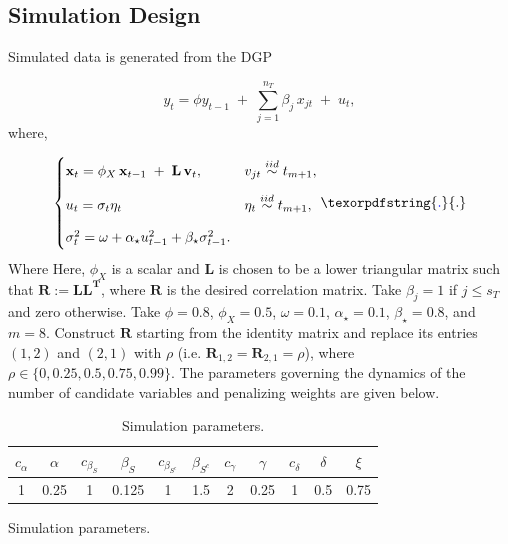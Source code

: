 \documentclass[10pt,a4paper,oneside]{article}
\providecommand{\DIFaddtex}[1]{{\protect\color{blue} \sf #1}} %
\providecommand{\DIFdeltex}[1]{{\protect\color{red} \scriptsize #1}} %
\providecommand{\DIFaddbegin}{} %
\providecommand{\DIFaddend}{} %
\providecommand{\DIFdelbegin}{} %
\providecommand{\DIFdelend}{} %
\providecommand{\DIFaddFL}[1]{\DIFadd{#1}} %
\providecommand{\DIFdelFL}[1]{\DIFdel{#1}} %
\providecommand{\DIFaddbeginFL}{} %
\providecommand{\DIFaddendFL}{} %
\providecommand{\DIFdelbeginFL}{} %
\providecommand{\DIFdelendFL}{} %
\providecommand{\DIFadd}[1]{\texorpdfstring{\DIFaddtex{#1}}{#1}} %
\providecommand{\DIFdel}[1]{\texorpdfstring{\DIFdeltex{#1}}{}} %
\newcommand{\DIFscaledelfig}{0.5}
\newlength{\DIFdelgraphicswidth} %
\newlength{\DIFdelgraphicsheight} %
\newcommand{\DIFaddincludegraphics}[2][]{{\color{blue}\fbox{\DIFOincludegraphics[#1]{#2}}}} %
\newcommand{\DIFdelincludegraphics}[2][]{%
\sbox{\DIFdelgraphicsbox}{\DIFOincludegraphics[#1]{#2}}%
\settoboxwidth{\DIFdelgraphicswidth}{\DIFdelgraphicsbox} %
\settoboxtotalheight{\DIFdelgraphicsheight}{\DIFdelgraphicsbox} %
\scalebox{\DIFscaledelfig}{%
\parbox[b]{\DIFdelgraphicswidth}{\usebox{\DIFdelgraphicsbox}\\[-\baselineskip] \rule{\DIFdelgraphicswidth}{0em}}\llap{\resizebox{\DIFdelgraphicswidth}{\DIFdelgraphicsheight}{%
\setlength{\unitlength}{\DIFdelgraphicswidth}%
\begin{picture}(1,1)%
\thicklines\linethickness{2pt} %
{\color[rgb]{1,0,0}\put(0,0){\framebox(1,1){}}}%
{\color[rgb]{1,0,0}\put(0,0){\line( 1,1){1}}}%
{\color[rgb]{1,0,0}\put(0,1){\line(1,-1){1}}}%
\end{picture}%
}\hspace*{3pt}}} %
} %
\DeclareRobustCommand{\DIFaddbegin}{\DIFOaddbegin \let\includegraphics\DIFaddincludegraphics} %
\DeclareRobustCommand{\DIFaddend}{\DIFOaddend \let\includegraphics\DIFOincludegraphics} %
\DeclareRobustCommand{\DIFdelbegin}{\DIFOdelbegin \let\includegraphics\DIFdelincludegraphics} %
\DeclareRobustCommand{\DIFdelend}{\DIFOaddend \let\includegraphics\DIFOincludegraphics} %
\DeclareRobustCommand{\DIFaddbeginFL}{\DIFOaddbeginFL \let\includegraphics\DIFaddincludegraphics} %
\DeclareRobustCommand{\DIFaddendFL}{\DIFOaddendFL \let\includegraphics\DIFOincludegraphics} %
\DeclareRobustCommand{\DIFdelbeginFL}{\DIFOdelbeginFL \let\includegraphics\DIFdelincludegraphics} %
\DeclareRobustCommand{\DIFdelendFL}{\DIFOaddendFL \let\includegraphics\DIFOincludegraphics} %
\begin{document}
\subsection{Simulation Design}
\label{subsec:simulation_design}


Simulated data is generated from the DGP

\begin{equation*}
y_t 
= 
\displaystyle \phi y_{t - 1}
\;+\;
\sum^{n_T}_{j = 1} \beta_j\,x_{j t}
\;+\; u_t,  
\end{equation*}
where,

\[
\begin{cases}
\mathbf{x}_t=
\displaystyle \phi_X \,\mathbf{x}_{t-1}
\;+\;
\mathbf{L}\,\mathbf{v}_t,
&
v_{jt} \overset{iid}{\sim} t_{m + 1},\\[2ex]
u_t = \sigma_t \eta_t 
&
\eta_t \overset{iid}{\sim} t_{m + 1},\\[2ex]
\sigma^2_t = \omega + \alpha_{\star} u_{t - 1}^2 + \beta_{\star} \sigma^2_{t - 1}.
\end{cases}\DIFaddbegin \DIFadd{.
}\DIFaddend \]
\DIFdelbegin \DIFdel{Where }\DIFdelend \DIFaddbegin \DIFadd{Here, }\DIFaddend $\phi_X$ is a scalar and $\mathbf{L}$ is chosen to be a lower triangular matrix such that $\mathbf{R} := \mathbf{L} \mathbf{L^T}$, where $\mathbf{R}$ is the desired correlation matrix. Take $\beta_j = 1$ if $j \leq s_T$ and zero otherwise. Take $\phi = 0.8$, $\phi_X = 0.5$, $\omega = 0.1$, $\alpha_\star = 0.1$, $\beta_\star = 0.8$, and $m = 8$. Construct $\mathbf{R}$ starting from the identity matrix and replace its entries $(1, 2)$ and $(2, 1)$ with $\rho$ (i.e. $\mathbf{R}_{1,2} = \mathbf{R}_{2,1} = \rho$), where $\rho \in \{0, 0.25, 0.5, 0.75, 0.99 \}$. The parameters governing the dynamics of the number of candidate variables and penalizing weights are given below.


\begin{table}[h]
  \DIFaddbeginFL \caption{\DIFaddFL{Simulation parameters.}}

\DIFaddendFL \centering
\begin{tabular}{ccccccccccc}
\hline
$c_{\alpha}$ & $\alpha$ & $c_{\beta_{S}}$ & $\beta_{S}$ & $c_{\beta_{S^c}}$ & $\beta_{S^c}$ & $c_{\gamma}$ & $\gamma$ & $c_{\delta}$ & $\delta$ & $\xi$ \\
\hline
1 & 0.25 & 1 & 0.125 & 1 & 1.5 & 2 & 0.25 & 1 & 0.5 & 0.75 \\
\hline
\end{tabular}
\DIFdelbeginFL %
{%
\DIFdelFL{Simulation parameters.}}
\DIFdelendFL \DIFaddbeginFL 

\DIFaddendFL \end{table}
\end{document}

